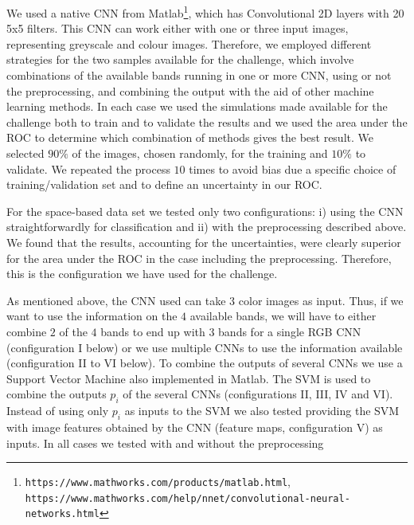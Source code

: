 \documentclass[useAMS,usenatbib]{mnras}
\begin{document}
We used a native CNN from Matlab\footnote{\texttt{https://www.mathworks.com/products/matlab.html}, \texttt{https://www.mathworks.com/help/nnet/convolutional-neural-networks.html}}, which has Convolutional 2D layers with 20 5x5 filters. This CNN can work either with one or three input images, representing greyscale and colour images.
Therefore, we employed different strategies for the two samples available for the challenge, which involve combinations of the available bands running in one or more CNN, using or not the preprocessing, and combining the output with the aid of other machine learning methods.
In each case we used the simulations made available for the challenge both to train and to validate the results and we used the area under the ROC to determine which combination of methods gives the best result.    
We selected 
$90\%$ of the images, chosen randomly, for the training and $10\%$ to validate. We repeated the process $10$ times to avoid bias due a specific choice of training/validation set and to define an uncertainty in our ROC.

For the space-based data set we tested only two configurations: i) using the CNN straightforwardly for classification and ii) with the preprocessing described above. 
We found that the results, accounting for the uncertainties,  
were clearly superior for the area under the ROC in the case 
including the preprocessing. Therefore, this is the configuration we have used for the challenge. 

As mentioned above, the CNN used can take 3 color images as input. Thus, if we want to use the information on the $4$ available bands, we will have to either combine $2$ of the $4$ bands to end up with $3$ bands for a single RGB CNN (configuration I below) or we use multiple CNNs to use the information available (configuration II to VI below). To combine the outputs of several CNNs we use a Support Vector Machine \citep[hereafter SVM; see e.g., ][]{rebentrost2014quantum} also implemented in Matlab. The SVM is used to combine the outputs $p_i$ of the several CNNs (configurations II, III, IV and VI). Instead of using only $p_i$ as inputs to the SVM we also tested providing the SVM with image features obtained by the CNN (feature maps, configuration V) as inputs. In all cases we tested with and without the preprocessing
\end{document}
